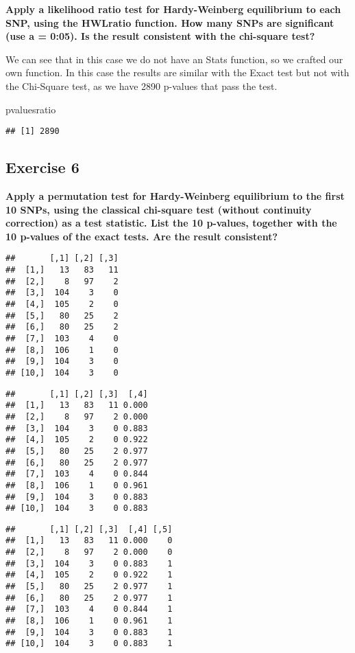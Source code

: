 \documentclass[]{article}
\newenvironment{Shaded}{\begin{snugshade}}{\end{snugshade}}
\newcommand{\NormalTok}[1]{#1}
\begin{document}
\textbf{Apply a likelihood ratio test for Hardy-Weinberg equilibrium to
each SNP, using the HWLratio function. How many SNPs are significant
(use a = 0:05). Is the result consistent with the chi-square test?}

We can see that in this case we do not have an Stats function, so we
crafted our own function. In this case the results are similar with the
Exact test but not with the Chi-Square test, as we have 2890 p-values
that pass the test.

\begin{Shaded}
\begin{Highlighting}[]
\NormalTok{pvaluesratio}
\end{Highlighting}
\end{Shaded}

\begin{verbatim}
## [1] 2890
\end{verbatim}

\subsection{Exercise 6}\label{exercise-6}

\textbf{Apply a permutation test for Hardy-Weinberg equilibrium to the
first 10 SNPs, using the classical chi-square test (without continuity
correction) as a test statistic. List the 10 p-values, together with the
10 p-values of the exact tests. Are the result consistent?}

\begin{verbatim}
##       [,1] [,2] [,3]
##  [1,]   13   83   11
##  [2,]    8   97    2
##  [3,]  104    3    0
##  [4,]  105    2    0
##  [5,]   80   25    2
##  [6,]   80   25    2
##  [7,]  103    4    0
##  [8,]  106    1    0
##  [9,]  104    3    0
## [10,]  104    3    0
\end{verbatim}

\begin{verbatim}
##       [,1] [,2] [,3]  [,4]
##  [1,]   13   83   11 0.000
##  [2,]    8   97    2 0.000
##  [3,]  104    3    0 0.883
##  [4,]  105    2    0 0.922
##  [5,]   80   25    2 0.977
##  [6,]   80   25    2 0.977
##  [7,]  103    4    0 0.844
##  [8,]  106    1    0 0.961
##  [9,]  104    3    0 0.883
## [10,]  104    3    0 0.883
\end{verbatim}

\begin{verbatim}
##       [,1] [,2] [,3]  [,4] [,5]
##  [1,]   13   83   11 0.000    0
##  [2,]    8   97    2 0.000    0
##  [3,]  104    3    0 0.883    1
##  [4,]  105    2    0 0.922    1
##  [5,]   80   25    2 0.977    1
##  [6,]   80   25    2 0.977    1
##  [7,]  103    4    0 0.844    1
##  [8,]  106    1    0 0.961    1
##  [9,]  104    3    0 0.883    1
## [10,]  104    3    0 0.883    1
\end{verbatim}
\end{document}
